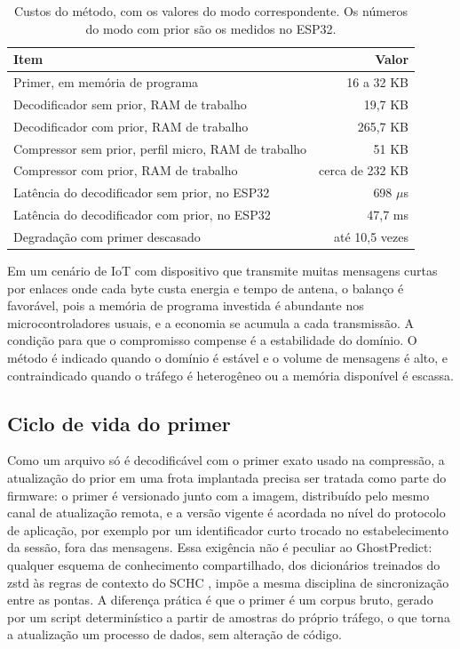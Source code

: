 \documentclass[12pt]{article}
\begin{document}
\begin{table}[ht]
\centering
\caption{Custos do método, com os valores do modo correspondente. Os números do
  modo com prior são os medidos no ESP32.}
\label{tab:custos}
\begin{tabular}{lr}
\toprule
\textbf{Item} & \textbf{Valor} \\
\midrule
Primer, em memória de programa & 16 a 32 KB \\
Decodificador sem prior, RAM de trabalho & 19,7 KB \\
Decodificador com prior, RAM de trabalho & 265,7 KB \\
Compressor sem prior, perfil micro, RAM de trabalho & 51 KB \\
Compressor com prior, RAM de trabalho & cerca de 232 KB \\
Latência do decodificador sem prior, no ESP32 & 698 $\mu$s \\
Latência do decodificador com prior, no ESP32 & 47,7 ms \\
Degradação com primer descasado & até 10,5 vezes \\
\bottomrule
\end{tabular}
\end{table}

Em um cenário de IoT com dispositivo que transmite muitas mensagens curtas por
enlaces onde cada byte custa energia e tempo de antena, o balanço é favorável,
pois a memória de programa investida é abundante nos microcontroladores usuais,
e a economia se acumula a cada transmissão. A condição para que o compromisso
compense é a estabilidade do domínio. O método é indicado quando o domínio é
estável e o volume de mensagens é alto, e contraindicado quando o tráfego é
heterogêneo ou a memória disponível é escassa.

\subsection{Ciclo de vida do primer}

Como um arquivo só é decodificável com o primer exato usado na compressão, a
atualização do prior em uma frota implantada precisa ser tratada como parte do
firmware: o primer é versionado junto com a imagem, distribuído pelo mesmo canal
de atualização remota, e a versão vigente é acordada no nível do protocolo de
aplicação, por exemplo por um identificador curto trocado no estabelecimento da
sessão, fora das mensagens. Essa exigência não é peculiar ao GhostPredict:
qualquer esquema de conhecimento compartilhado, dos dicionários treinados do
zstd às regras de contexto do SCHC \cite{minaburo:20}, impõe a mesma disciplina
de sincronização entre as pontas. A diferença prática é que o primer é um corpus
bruto, gerado por um script determinístico a partir de amostras do próprio
tráfego, o que torna a atualização um processo de dados, sem alteração de
código.
\end{document}
